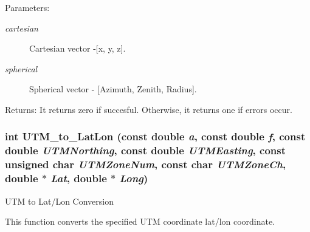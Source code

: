 \begin{Desc}
\item[Parameters:]
\begin{description}
\item[{\em cartesian}]Cartesian vector -\mbox{[}x, y, z\mbox{]}. \item[{\em spherical}]Spherical vector - \mbox{[}Azimuth, Zenith, Radius\mbox{]}.\end{description}
\end{Desc}
\begin{Desc}
\item[Returns:]It returns zero if succesful. Otherwise, it returns one if errors occur. \end{Desc}
\hypertarget{group__Coordinate_gc09942cce14db1739c8441e4cca8a5a6}{
\subsubsection[UTM\_\-to\_\-LatLon]{\setlength{\rightskip}{0pt plus 5cm}int UTM\_\-to\_\-LatLon (const double {\em a}, \/  const double {\em f}, \/  const double {\em UTMNorthing}, \/  const double {\em UTMEasting}, \/  const unsigned char {\em UTMZoneNum}, \/  const char {\em UTMZoneCh}, \/  double $\ast$ {\em Lat}, \/  double $\ast$ {\em Long})}}
\label{group__Coordinate_gc09942cce14db1739c8441e4cca8a5a6}


UTM to Lat/Lon Conversion 

This function converts the specified UTM coordinate lat/lon coordinate.

